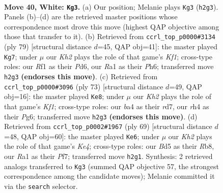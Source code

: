 \documentclass[11pt]{article}
\begin{document}
\clearpage

\begin{figure}[p]\centering
\begin{subfigure}{0.46\textwidth}\centering
\resizebox{\linewidth}{!}{%
\newchessgame
\chessboard[
  setfen={r7/pp3p2/6k1/3B3p/bP2P2r/P6p/7K/R4R2 w - - 6 40},
  showmover=false,
  pgfstyle=straightmove, color=movearrow, markmove={h2-g3}
]}
\caption{}
\end{subfigure}\hfill
\begin{subfigure}{0.46\textwidth}\centering
\resizebox{\linewidth}{!}{%
\newchessgame
\chessboard[
  setfen={5k2/2p2p2/3pb2p/p7/r1P1PRP1/3K3P/8/2R5 b - - 0 40},
  showmover=false,
  pgfstyle=straightmove, color=movearrow, markmove={f8-g7}
]}
\caption{}
\end{subfigure}
\\[4pt]
\begin{subfigure}{0.46\textwidth}\centering
\resizebox{\linewidth}{!}{%
\newchessgame
\chessboard[
  setfen={5k2/3R3p/6p1/P1b2p2/8/8/1rrB1PPP/3R2K1 b - - 0 37},
  showmover=false,
  pgfstyle=straightmove, color=movearrow, markmove={f8-e8}
]}
\caption{}
\end{subfigure}\hfill
\begin{subfigure}{0.46\textwidth}\centering
\resizebox{\linewidth}{!}{%
\newchessgame
\chessboard[
  setfen={1r1b4/R4p1p/1P1r2p1/B3k3/8/3p1P2/5P1P/1R1K4 b - - 3 35},
  showmover=false,
  pgfstyle=straightmove, color=movearrow, markmove={e5-e6}
]}
\caption{}
\end{subfigure}
\caption{\textbf{Move 40, White: \texttt{Kg3}.} (a) Our position; Melanie plays \texttt{Kg3} (\texttt{h2g3}). Panels (b)--(d) are the retrieved master positions whose correspondence most drove this move (highest QAP objective among those that transfer to it). (b) Retrieved from \texttt{ccrl\_top\_p0000\#3134} (ply 79) [structural distance $d$=45, QAP obj=41]: the master played \texttt{Kg7}; under $\mu$ our \emph{Kh2} plays the role of that game's \emph{Kf1}; cross-type roles: our \emph{R}f1 as their \emph{P}d6, our \emph{R}a1 as their \emph{P}h6; transferred move \texttt{h2g3} \textbf{(endorses this move)}. (c) Retrieved from \texttt{ccrl\_top\_p0000\#3096} (ply 73) [structural distance $d$=49, QAP obj=16]: the master played \texttt{Ke8}; under $\mu$ our \emph{Kh2} plays the role of that game's \emph{Kf1}; cross-type roles: our \emph{b}a4 as their \emph{r}d7, our \emph{r}h4 as their \emph{P}g6; transferred move \texttt{h2g3} \textbf{(endorses this move)}. (d) Retrieved from \texttt{ccrl\_top\_p0002\#1967} (ply 69) [structural distance $d$=48, QAP obj=60]: the master played \texttt{Ke6}; under $\mu$ our \emph{Kh2} plays the role of that game's \emph{Ke4}; cross-type roles: our \emph{B}d5 as their \emph{R}b8, our \emph{R}a1 as their \emph{P}f7; transferred move \texttt{h2g1}. Synthesis: 2 retrieved analogs transferred to \texttt{Kg3} (summed QAP objective 57, the strongest correspondence among the candidate moves); Melanie committed it via the \texttt{search} selector.}
\label{fig:thought-m78}
\end{figure}
\end{document}
